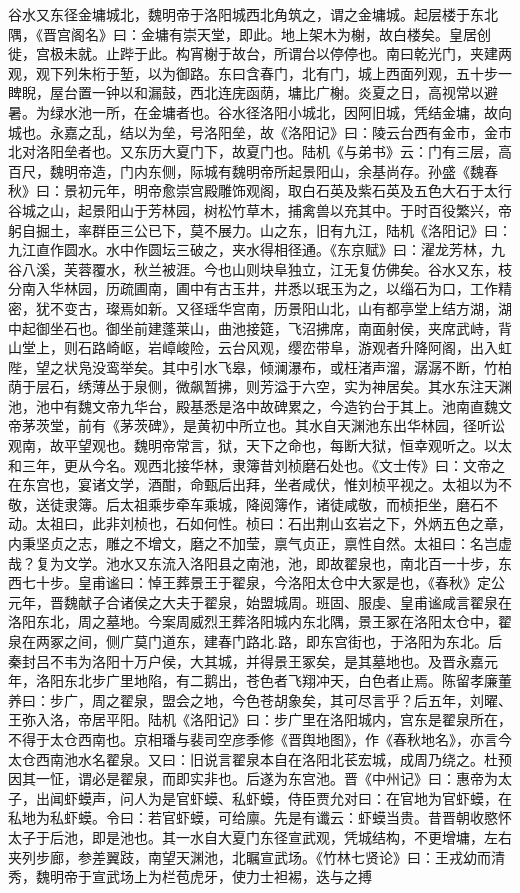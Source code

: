 \documentclass[12pt,UTF8]{ctexbook}
\begin{document}
谷水又东径金墉城北，魏明帝于洛阳城西北角筑之，谓之金墉城。起层楼于东北隅，《晋宫阁名》曰：金墉有崇天堂，即此。地上架木为榭，故白楼矣。皇居创徙，宫极未就。止跸于此。构宵榭于故台，所谓台以停停也。南曰乾光门，夹建两观，观下列朱桁于堑，以为御路。东曰含春门，北有门，城上西面列观，五十步一睥睨，屋台置一钟以和漏鼓，西北连庑函荫，墉比广榭。炎夏之日，高视常以避暑。为绿水池一所，在金墉者也。谷水径洛阳小城北，因阿旧城，凭结金墉，故向城也。永嘉之乱，结以为垒，号洛阳垒，故《洛阳记》曰：陵云台西有金市，金市北对洛阳垒者也。又东历大夏门下，故夏门也。陆机《与弟书》云：门有三层，高百尺，魏明帝造，门内东侧，际城有魏明帝所起景阳山，余基尚存。孙盛《魏春秋》曰：景初元年，明帝愈崇宫殿雕饰观阁，取白石英及紫石英及五色大石于太行谷城之山，起景阳山于芳林园，树松竹草木，捕禽兽以充其中。于时百役繁兴，帝躬自掘土，率群臣三公已下，莫不展力。山之东，旧有九江，陆机《洛阳记》曰：九江直作圆水。水中作圆坛三破之，夹水得相径通。《东京赋》曰：濯龙芳林，九谷八溪，芙蓉覆水，秋兰被涯。今也山则块阜独立，江无复仿佛矣。谷水又东，枝分南入华林园，历疏圃南，圃中有古玉井，井悉以珉玉为之，以缁石为口，工作精密，犹不变古，璨焉如新。又径瑶华宫南，历景阳山北，山有都亭堂上结方湖，湖中起御坐石也。御坐前建蓬莱山，曲池接筵，飞沼拂席，南面射侯，夹席武峙，背山堂上，则石路崎岖，岩嶂峻险，云台风观，缨峦带阜，游观者升降阿阁，出入虹陛，望之状凫没鸾举矣。其中引水飞皋，倾澜瀑布，或枉渚声溜，潺潺不断，竹柏荫于层石，绣薄丛于泉侧，微飙暂拂，则芳溢于六空，实为神居矣。其水东注天渊池，池中有魏文帝九华台，殿基悉是洛中故碑累之，今造钓台于其上。池南直魏文帝茅茨堂，前有《茅茨碑》，是黄初中所立也。其水自天渊池东出华林园，径听讼观南，故平望观也。魏明帝常言，狱，天下之命也，每断大狱，恒幸观听之。以太和三年，更从今名。观西北接华林，隶簿昔刘桢磨石处也。《文士传》曰：文帝之在东宫也，宴诸文学，酒酣，命甄后出拜，坐者咸伏，惟刘桢平视之。太祖以为不敬，送徒隶簿。后太祖乘步牵车乘城，降阅簿作，诸徒咸敬，而桢拒坐，磨石不动。太祖曰，此非刘桢也，石如何性。桢曰：石出荆山玄岩之下，外炳五色之章，内秉坚贞之志，雕之不增文，磨之不加莹，禀气贞正，禀性自然。太祖曰：名岂虚哉？复为文学。池水又东流入洛阳县之南池，池，即故翟泉也，南北百一十步，东西七十步。皇甫谧曰：悼王葬景王于翟泉，今洛阳太仓中大冢是也，《春秋》定公元年，晋魏献子合诸侯之大夫于翟泉，始盟城周。班固、服虔、皇甫谧咸言翟泉在洛阳东北，周之墓地。今案周威烈王葬洛阳城内东北隅，景王冢在洛阳太仓中，翟泉在两冢之间，侧广莫门道东，建春门路北.路，即东宫街也，于洛阳为东北。后秦封吕不韦为洛阳十万户侯，大其城，并得景王冢矣，是其墓地也。及晋永嘉元年，洛阳东北步广里地陷，有二鹅出，苍色者飞翔冲天，白色者止焉。陈留孝廉董养曰：步广，周之翟泉，盟会之地，今色苍胡象矣，其可尽言乎？后五年，刘曜、王弥入洛，帝居平阳。陆机《洛阳记》曰：步广里在洛阳城内，宫东是翟泉所在，不得于太仓西南也。京相璠与裴司空彦季修《晋舆地图》，作《春秋地名》，亦言今太仓西南池水名翟泉。又曰：旧说言翟泉本自在洛阳北苌宏城，成周乃绕之。杜预因其一怔，谓必是翟泉，而即实非也。后遂为东宫池。晋《中州记》曰：惠帝为太子，出闻虾蟆声，问人为是官虾蟆、私虾蟆，侍臣贾允对曰：在官地为官虾蟆，在私地为私虾蟆。令曰：若官虾蟆，可给廪。先是有谶云：虾蟆当贵。昔晋朝收愍怀太子于后池，即是池也。其一水自大夏门东径宣武观，凭城结构，不更增墉，左右夹列步廊，参差翼跂，南望天渊池，北瞩宣武场。《竹林七贤论》曰：王戎幼而清秀，魏明帝于宣武场上为栏苞虎牙，使力士袒裼，迭与之搏
\end{document}
